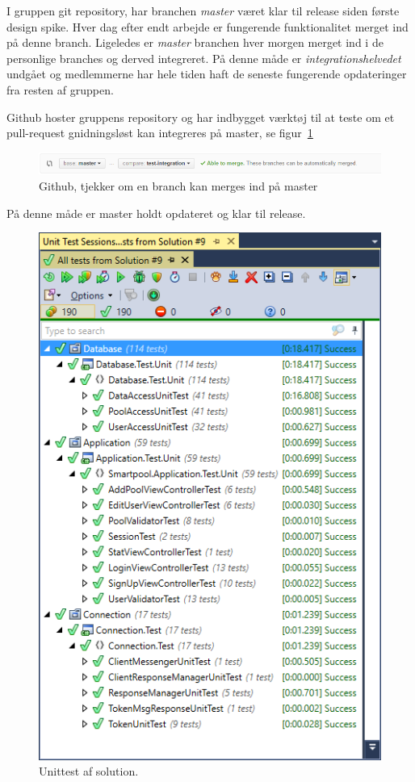 I gruppen git repository, har branchen \textit{master} været klar til release siden første design spike. Hver dag efter endt arbejde er fungerende funktionalitet merget ind på denne branch. Ligeledes er \textit{master} branchen hver morgen merget ind i de personlige branches og derved integreret. På denne måde er \textit{integrationshelvedet} undgået og medlemmerne har hele tiden haft de seneste fungerende opdateringer fra resten af gruppen.

Github hoster gruppens repository og har indbygget værktøj til at teste om et pull-request gnidningsløst kan integreres på master, se figur~\ref{fig:gitmerge}

\begin{figure}[h]
\centering
\includegraphics[width=\linewidth]{figs/test/gitmerge.png}
\caption{Github, tjekker om en branch kan merges ind på master}
\label{fig:gitmerge}
\end{figure}

På denne måde er master holdt opdateret og klar til release.

\begin{figure}[h]
	\centering
	\includegraphics[width=0.5\linewidth]{figs/test/vsUnittest}
	\caption{Unittest af solution.}
	\label{fig:coverage}
\end{figure}



%
%
%


